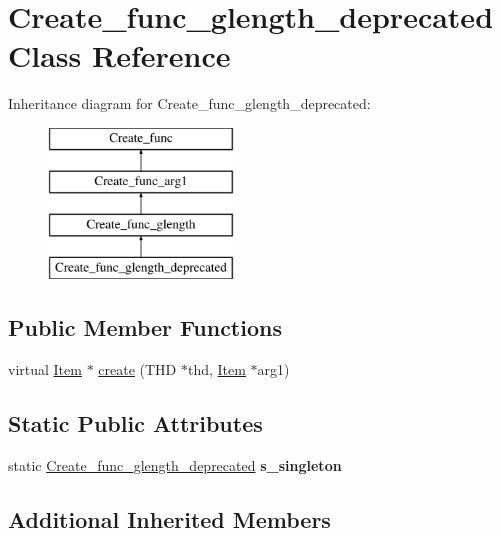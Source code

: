 \hypertarget{classCreate__func__glength__deprecated}{}\section{Create\+\_\+func\+\_\+glength\+\_\+deprecated Class Reference}
\label{classCreate__func__glength__deprecated}
Inheritance diagram for Create\+\_\+func\+\_\+glength\+\_\+deprecated\+:\begin{figure}[H]
\begin{center}
\leavevmode
\includegraphics[height=4.000000cm]{classCreate__func__glength__deprecated}
\end{center}
\end{figure}
\subsection*{Public Member Functions}
\begin{DoxyCompactItemize}
\item 
virtual \mbox{\hyperlink{classItem}{Item}} $\ast$ \mbox{\hyperlink{classCreate__func__glength__deprecated_a470bf648f489bdad5f2c621a0c046c9d}{create}} (T\+HD $\ast$thd, \mbox{\hyperlink{classItem}{Item}} $\ast$arg1)
\end{DoxyCompactItemize}
\subsection*{Static Public Attributes}
\begin{DoxyCompactItemize}
\item 
\mbox{\label{classCreate__func__glength__deprecated_aec41ae9c975d7925903fed2c7af3676c}} 
static \mbox{\hyperlink{classCreate__func__glength__deprecated}{Create\+\_\+func\+\_\+glength\+\_\+deprecated}} {\bfseries s\+\_\+singleton}
\end{DoxyCompactItemize}
\subsection*{Additional Inherited Members}


